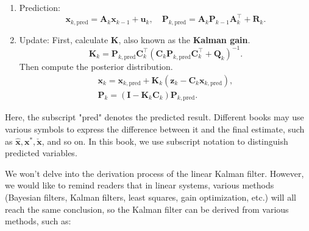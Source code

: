 \begin{mdframed}
	\begin{enumerate}
		\item Prediction:
		\begin{equation}
			\mathbf{x}_{k,\mathrm{pred}} = {\mathbf{A}_k {\mathbf{x}_{k - 1}} + {\mathbf{u}_k}}, \quad 
			\mathbf{P}_{k,\mathrm{pred}} = \mathbf{A}_k \mathbf{P}_{k-1} \mathbf{A}^\top_k + \mathbf{R}_k.
		\end{equation}
		\item Update:
		First, calculate $\mathbf{K}$, also known as the \textbf{Kalman gain}.
		\begin{equation}
			\label{eq:kalman-K-another}
			\mathbf{K}_k = \mathbf{P}_{k, \mathrm{pred}} \mathbf{C}_k^\top {\left( {\mathbf{C}_k \mathbf{P}_{k, 
						\mathrm{pred}} \mathbf{C}_k^\top + {\mathbf{Q}_k}} \right)^{ - 1}}.
		\end{equation}
		Then compute the posterior distribution.
		\begin{equation}
			\begin{array}{l}
				{\mathbf{x}}_k = {\mathbf{x}_{k, \mathrm{pred}}} + \mathbf{K}_k \left( {\mathbf{z}_k - 
					{\mathbf{C}_k}{\mathbf{x}_{k, \mathrm{pred}}}} \right), \\
				\mathbf{P}_k = \left( {\mathbf{I} - \mathbf{K}_k {\mathbf{C}_k}} \right) \mathbf{P}_{k, \mathrm{pred}}.
			\end{array}
		\end{equation}
	\end{enumerate}
\end{mdframed}

Here, the subscript "pred" denotes the predicted result. Different books may use various symbols to express the difference between it and the final estimate, such as $\hat{\mathbf{x}}, \mathbf{x}^*, \check{\mathbf{x}}$, and so on. In this book, we use subscript notation to distinguish predicted variables.

We won't delve into the derivation process of the linear Kalman filter. However, we would like to remind readers that in linear systems, various methods (Bayesian filters, Kalman filters, least squares, gain optimization, etc.) will all reach the same conclusion, so the Kalman filter can be derived from various methods, such as:

